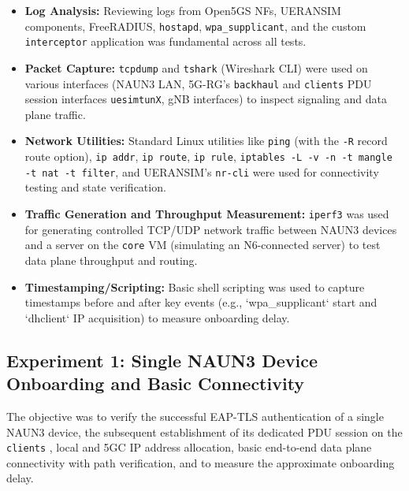 \begin{itemize}
    \item \textbf{Log Analysis:} Reviewing logs from Open5GS \acp{NF}, UERANSIM components, FreeRADIUS, \texttt{hostapd}, \texttt{wpa\_supplicant}, and the custom \texttt{interceptor} application was fundamental across all tests.

    \item \textbf{Packet Capture:} \texttt{tcpdump} and \texttt{tshark} (Wireshark \ac{CLI}) were used on various interfaces (\ac{NAUN3} \ac{LAN}, \ac{5G-RG}'s \texttt{backhaul} and \texttt{clients} \ac{PDU} session interfaces \texttt{uesimtunX}, \ac{gNB} interfaces) to inspect signaling and data plane traffic.

    \item \textbf{Network Utilities:} Standard Linux utilities like \texttt{ping} (with the \texttt{-R} record route option), \texttt{ip addr}, \texttt{ip route}, \texttt{ip rule}, \texttt{iptables -L -v -n -t mangle -t nat -t filter}, and UERANSIM's \texttt{nr-cli} were used for connectivity testing and state verification.

    \item \textbf{Traffic Generation and Throughput Measurement:} \texttt{iperf3} was used for generating controlled \ac{TCP}/\ac{UDP} network traffic between \ac{NAUN3} devices and a server on the \texttt{core} \ac{VM} (simulating an N6-connected server) to test data plane throughput and routing.

    \item \textbf{Timestamping/Scripting:} Basic shell scripting was used to capture timestamps before and after key events (e.g., `wpa\_supplicant` start and `dhclient` IP acquisition) to measure onboarding delay.
\end{itemize}

\subsection{Experiment 1: Single \acs{NAUN3} Device Onboarding and Basic Connectivity}

The objective was to verify the successful \ac{EAP-TLS} authentication of a single \ac{NAUN3} device, the subsequent establishment of its dedicated \ac{PDU} session on the \texttt{clients} \aDNN, local and 5GC IP address allocation, basic end-to-end data plane connectivity with path verification, and to measure the approximate onboarding delay.

